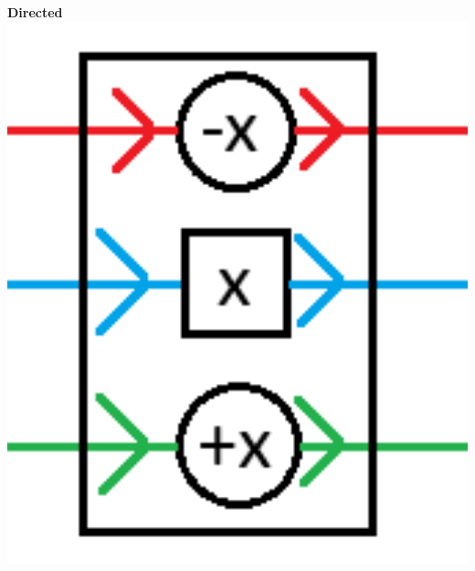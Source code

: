 \documentclass{beamer}
\begin{document}
\begin{frame}
\begin{minipage}[b]{0.32\textwidth}
  \end{minipage}
  \begin{minipage}[b]{0.32\textwidth}
    \textbf{Directed}
    \includegraphics[width=1\textwidth]{res/doors/DoorDirected.png}
  \end{minipage}

\end{frame}
\end{document}
